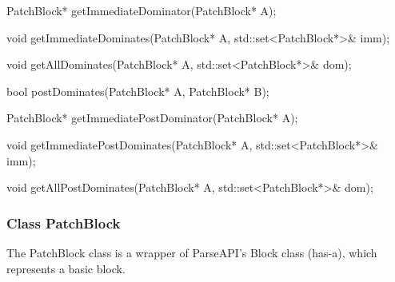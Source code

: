 \begin{apient}
PatchBlock* getImmediateDominator(PatchBlock* A);
\end{apient}

\begin{apient}
void getImmediateDominates(PatchBlock* A, std::set<PatchBlock*>& imm);
\end{apient}

\begin{apient}
void getAllDominates(PatchBlock* A, std::set<PatchBlock*>& dom);
\end{apient}


\begin{apient}
bool postDominates(PatchBlock* A, PatchBlock* B);
\end{apient}

\begin{apient}
PatchBlock* getImmediatePostDominator(PatchBlock* A);
\end{apient}

\begin{apient}
void getImmediatePostDominates(PatchBlock* A, std::set<PatchBlock*>& imm);
\end{apient}

\begin{apient}
void getAllPostDominates(PatchBlock* A, std::set<PatchBlock*>& dom);
\end{apient}

\subsubsection{Class PatchBlock}
\label{sec:patchblock}


The PatchBlock class is a wrapper of ParseAPI's Block class (has-a), which
represents a basic block.


